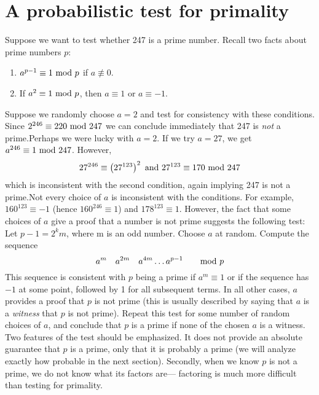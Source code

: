 \section{A probabilistic test for primality}\label{prim}
Suppose we want to test whether 247 is a prime number.  Recall two facts
about prime numbers $p$:\begin{enumerate}\item $a^{p-1}\equiv1\hbox{ mod }p$ if 
$a\not\equiv0$.\item If $a^2\equiv1\hbox{ mod }p$, then $a\equiv1$ or $a\equiv-1$.
\end{enumerate} Suppose we randomly choose $a=2$ and test for consistency
with these conditions.  Since $2^{246}\equiv220\hbox{ mod }247$ we can conclude
immediately that 247 is {\it not\/} a prime.\pq Perhaps we were lucky
with $a=2$.  If we try $a=27$, we get $a^{246}\equiv1\hbox{ mod }247$.  However,
$$27^{246}\equiv \left(27^{123}\right)^2\hbox{ and }27^{123}\equiv170\hbox{ mod }247$$
which is inconsistent with the second condition, again implying 247 is not
a prime.\pq Not every choice of $a$ is inconsistent with the conditions.
For example, $160^{123}\equiv-1$ (hence $160^{246}\equiv1$) and 
$178^{123}\equiv1$. However, the fact that some choices of $a$ give a
proof that a number is not prime suggests the following test:
 Let $p-1=2^km$, where m is an odd number.
Choose $a$ at random.  Compute the sequence $$a^m\quad a^{2m}\quad a^{4m}
\dots a^{p-1}\qquad\hbox{mod $p$}$$This sequence is consistent with $p$
being a prime if $a^m\equiv1$ or if the sequence has  $-1$ at some point,
followed by 1 for all subsequent terms.  In all other cases, $a$ provides
a proof that $p$ is not prime (this is usually described by saying that
$a$ is a {\it witness\/} that $p$ is not prime).  Repeat this test for
some number of random choices of $a$, and conclude that $p$ is a prime
if none of the chosen $a$ is a witness.
\pq Two features of the test should be emphasized.  It does not provide
an absolute guarantee that $p$ is a prime, only that it is probably a prime
(we will analyze exactly how probable in the next section).  Secondly,
when we know $p$ is not a prime, we do not know what its factors are---
factoring is much more difficult than testing for primality.

